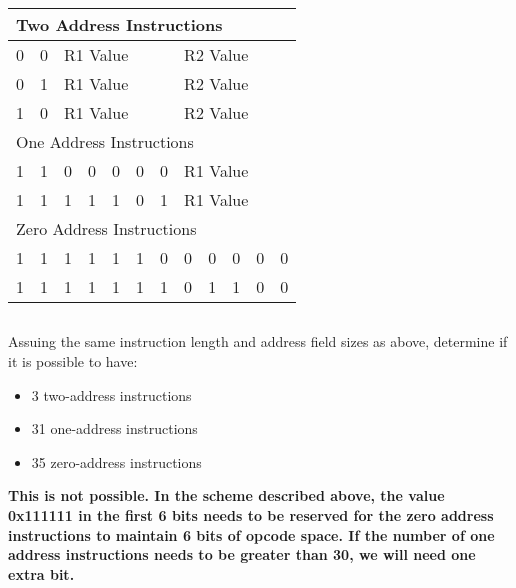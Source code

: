 \documentclass{article}
\begin{document}
    \begin{tabular}{|l|l||l|l|l|l|l||l|l|l|l|l|}
    \hline
    \multicolumn{12}{|l|}{Two Address Instructions}\\
    \hline
    0 & 0 & \multicolumn{5}{|l|}{R1 Value} & \multicolumn{5}{|l|}{R2 Value} \\
    0 & 1 & \multicolumn{5}{|l|}{R1 Value} & \multicolumn{5}{|l|}{R2 Value} \\
    1 & 0 & \multicolumn{5}{|l|}{R1 Value} & \multicolumn{5}{|l|}{R2 Value}\\
    \hline
    \multicolumn{12}{|l|}{One Address Instructions}\\
    \hline
    1 & 1 & 0 & 0 & 0 & 0 & 0 & \multicolumn{5}{|l|}{R1 Value}\\
    1 & 1 & 1 & 1 & 1 & 0 & 1 & \multicolumn{5}{|l|}{R1 Value}\\
    \hline
    \multicolumn{12}{|l|}{Zero Address Instructions}\\ 
    \hline
    1 & 1 & 1 & 1 & 1 & 1 & 0 & 0 & 0 & 0 & 0 & 0\\
    1 & 1 & 1 & 1 & 1 & 1 & 1 & 0 & 1 & 1 & 0 & 0\\
    \hline
    \end{tabular}

\subsection{}
Assuing the same instruction length and address field sizes as above, determine if it is possible to have:
\begin{itemize}
    \item 3 two-address instructions
    \item 31 one-address instructions
    \item 35 zero-address instructions
\end{itemize}
\vspace{5mm}
\textbf{This is not possible. In the scheme described above, the value 0x111111 in the first 6 bits needs to be reserved for the zero address instructions to maintain 6 bits of opcode space. If the number of one address instructions needs to be greater than 30, we will need one extra bit.}\\
\end{document}
